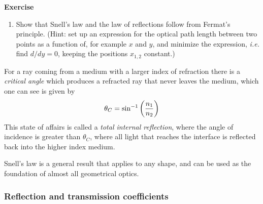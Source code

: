 {\bf Exercise}

\begin{enumerate}
\item Show that Snell's law and the law of reflections follow from
  Fermat's principle. (Hint: set up an expression for the optical path length
  between two points as a function of, for example $x$ and $y$, and
  minimize the expression, {\it i.e.} find ${d/dy}=0$, keeping the
  positions $x_{1,2}$ constant.)
\setcounter{count}{\value{enumi}} 
\end{enumerate}

For a ray coming
from a medium with a larger index of refraction there is a {\it critical angle} which 
produces a refracted ray that never leaves the medium, which one can see is given by 
\[
\theta_C=\sin^{-1}\left({n_1\over n_2}\right)
\]
This state of affairs is called a {\it total internal reflection}, where the angle of incidence is greater
than $\theta_C$, where all light that reaches the interface is reflected back into the higher index
medium. 

Snell's law is a general result that applies to any shape, and can be used as the foundation of 
almost all geometrical optics.

\subsubsection{Reflection and transmission coefficients}

